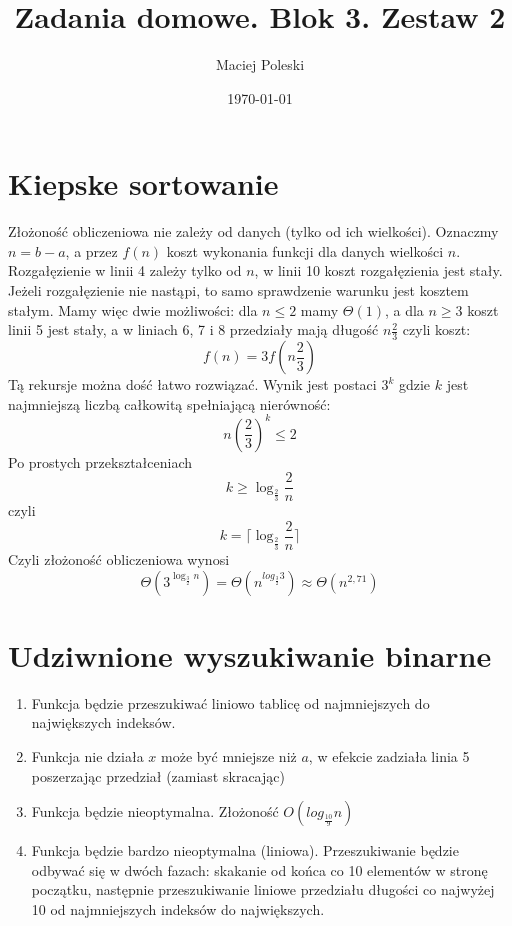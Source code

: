\documentclass[a4paper,12pt]{article}
\title{Zadania domowe. Blok 3. Zestaw 2}
\author{Maciej Poleski}
\date{\today}
\begin{document}
\maketitle

\newpage

\section{Kiepske sortowanie}
Złożoność obliczeniowa nie zależy od danych (tylko od ich wielkości). Oznaczmy $n=b-a$, a przez $f(n)$ koszt wykonania funkcji dla danych wielkości $n$. Rozgałęzienie w linii 4 zależy tylko od $n$, w linii 10 koszt rozgałęzienia jest stały. Jeżeli rozgałęzienie nie nastąpi, to samo sprawdzenie warunku jest kosztem stałym. Mamy więc dwie możliwości: dla $n\leq2$ mamy $\Theta(1)$, a dla $n\geq3$ koszt linii 5 jest stały, a w liniach 6, 7 i 8 przedziały mają długość $n\frac{2}{3}$ czyli koszt: $$f(n)=3f\left(n\frac{2}{3}\right)$$ Tą rekursje można dość łatwo rozwiązać. Wynik jest postaci $3^k$ gdzie $k$ jest najmniejszą liczbą całkowitą spełniającą nierówność: $$n\left(\frac{2}{3}\right)^k\leq2$$ Po prostych przekształceniach $$k\geq\log_\frac{2}{3}\frac{2}{n}$$ czyli $$k=\bigg\lceil\log_\frac{2}{3}\frac{2}{n}\bigg\rceil$$ Czyli złożoność obliczeniowa wynosi $$\Theta\left(3^{\log_\frac{3}{2}n}\right)=\Theta\left(n^{log_\frac{3}{2}3}\right)\approx\Theta\left(n^{2,71}\right)$$

\section{Udziwnione wyszukiwanie binarne}
\begin{enumerate}
 \item Funkcja będzie przeszukiwać liniowo tablicę od najmniejszych do największych indeksów.
 \item Funkcja nie działa $x$ może być mniejsze niż $a$, w efekcie zadziała linia 5 poszerzając przedział (zamiast skracając)
 \item Funkcja będzie nieoptymalna. Złożoność $O\left(log_\frac{10}{9}n\right)$
 \item Funkcja będzie bardzo nieoptymalna (liniowa). Przeszukiwanie będzie odbywać się w dwóch fazach: skakanie od końca co 10 elementów w stronę początku, następnie przeszukiwanie liniowe przedziału długości co najwyżej 10 od najmniejszych indeksów do największych.
\end{enumerate}
\end{document}
